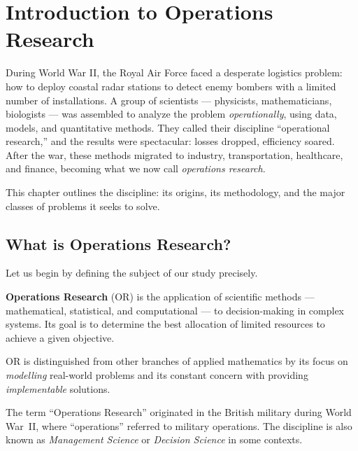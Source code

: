 \chapter{Introduction to Operations Research}
\label{ch:introduction}

During World War II, the Royal Air Force faced a desperate logistics
problem: how to deploy coastal radar stations to detect enemy bombers with a
limited number of installations. A group of scientists --- physicists,
mathematicians, biologists --- was assembled to analyze the problem
\emph{operationally}, using data, models, and quantitative methods. They
called their discipline ``operational research,'' and the results were
spectacular: losses dropped, efficiency soared. After the war, these methods
migrated to industry, transportation, healthcare, and finance, becoming what
we now call \emph{operations research}.

This chapter outlines the discipline: its origins, its methodology, and the
major classes of problems it seeks to solve.

\section{What is Operations Research?}

Let us begin by defining the subject of our study precisely.

\begin{definition}
\textbf{Operations Research} (OR) is the application of scientific methods
--- mathematical, statistical, and computational --- to decision-making in
complex systems.  Its goal is to determine the best allocation of limited
resources to achieve a given objective.
\end{definition}

OR is distinguished from other branches of applied mathematics by its focus
on \emph{modelling} real-world problems and its constant concern with
providing \emph{implementable} solutions.

\begin{remark}
The term ``Operations Research'' originated in the British military during
World War~II, where ``operations'' referred to military operations.  The
discipline is also known as \textit{Management Science} or
\textit{Decision Science} in some contexts.
\end{remark}

